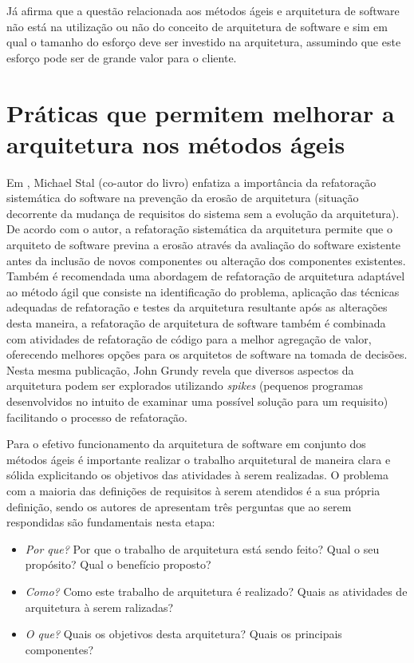 Já \cite{cockburn2006agile} afirma que a questão relacionada aos métodos ágeis e arquitetura de software não está na utilização ou não do conceito de arquitetura de software e sim em qual o tamanho do esforço deve ser investido na arquitetura, assumindo que este esforço pode ser de grande valor para o cliente.


\section{Práticas que permitem melhorar a arquitetura nos métodos ágeis}

Em \cite{babar2013agile}, Michael Stal (co-autor do livro) enfatiza a importância da refatoração sistemática do software na prevenção da erosão de arquitetura (situação decorrente da mudança de requisitos do sistema sem a evolução da arquitetura). De acordo com o autor, a refatoração sistemática da arquitetura  permite que o arquiteto de software previna a erosão através da avaliação do software existente antes da inclusão de novos componentes ou alteração dos componentes existentes. Também é recomendada uma abordagem de refatoração de arquitetura adaptável ao método ágil que consiste na identificação do problema, aplicação das técnicas adequadas de refatoração e testes da arquitetura resultante após as alterações desta maneira, a refatoração de arquitetura de software também é combinada com atividades de refatoração de código para a melhor agregação de valor, oferecendo melhores opções para os arquitetos de software na tomada de decisões. Nesta mesma publicação, John Grundy revela que diversos aspectos da arquitetura podem ser explorados utilizando \textit{spikes} (pequenos programas desenvolvidos no intuito de examinar uma possível solução para um requisito) facilitando o processo de refatoração.

Para o efetivo funcionamento da arquitetura de software em conjunto dos métodos ágeis é importante realizar o trabalho arquitetural de maneira clara e sólida explicitando os objetivos das atividades à serem realizadas. O problema com a maioria das definições de requisitos à serem atendidos é a sua própria definição, sendo os autores de \cite{babar2013agile} apresentam três perguntas que ao serem respondidas são fundamentais nesta etapa:

\begin{itemize}
    \item \textit{Por que?} Por que o trabalho de arquitetura está sendo feito? Qual o seu propósito? Qual o benefício proposto?
    \item \textit{Como?} Como este trabalho de arquitetura é realizado? Quais as atividades de arquitetura à serem ralizadas?
    \item \textit{O que?} Quais os objetivos desta arquitetura? Quais os principais componentes?
\end{itemize}

